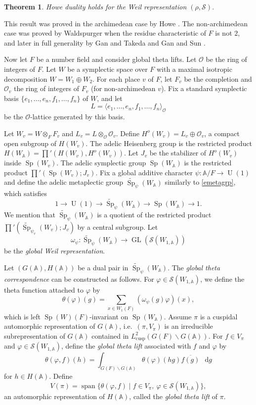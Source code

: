 \documentclass[11pt]{article}
\theoremstyle{plain}
\newtheorem{theorem}{Theorem}[section]
\theoremstyle{remark}
\theoremstyle{definition}
\newcommand*\dd{\mathop{}\!\mathrm{d}}
\DeclareMathOperator{\spn}{span}
\DeclareMathOperator{\GL}{GL}
\DeclareMathOperator{\U}{U}
\DeclareMathOperator{\cusp}{cusp}
\DeclareMathOperator{\Sp}{Sp}
\begin{document}
\begin{theorem}
Howe duality holds for the Weil representation $(\rho,\mathcal{S})$.
\end{theorem}
This result was proved in the archimedean case by Howe \cite{Howe77}.
The non-archimedean case was proved by Waldspurger \cite{Waldspurger1989} when the residue characteristic of $F$ is not $2$, and later in full generality by Gan and Takeda \cite{GanTak2016} and Gan and Sun \cite{GanSun2017}.

Now let $F$ be a number field and consider global theta lifts.
Let $\mathcal{O}$ be the ring of integers of $F$.
Let $W$ be a symplectic space over $F$ with a maximal isotropic decomposition $W=W_1\oplus W_2$.
For each place $v$ of $F$, let $F_v$ be the completion and $\mathcal{O}_v$ the ring of integers of $F_v$ (for non-archimedean $v$).
Fix a standard symplectic basis $\{e_1,\dots,e_n,f_1,\dots,f_n\}$ of $W$, and let
\[
L=\langle e_1,\dots,e_n,f_1,\dots,f_n\rangle_{\mathcal{O}}
\]
be the $\mathcal{O}$-lattice generated by this basis.

Let $W_v=W\otimes_F F_v$ and $L_v=L\otimes_{\mathcal{O}}\mathcal{O}_v$.
Define $H^{o}(W_v)=L_v\oplus \mathcal{O}_v$, a compact open subgroup of $H(W_v)$.
The adelic Heisenberg group is the restricted product $H(W_{\mathbb{A}})=\prod'(H(W_v),H^{o}(W_v))$.
Let $J_v$ be the stabilizer of $H^{o}(W_v)$ inside $\Sp(W_v)$.
The adelic symplectic group $\Sp(W_{\mathbb{A}})$ is the restricted product $\prod'(\Sp(W_v);J_v)$.
Fix a global additive character $\psi\colon \mathbb{A}/F\to \U(1)$ and define the adelic metaplectic group $\widetilde{\Sp}_{\psi}(W_{\mathbb{A}})$ similarly to \eqref{emetagrp}, which satisfies
\[
1\to \U(1)\to \widetilde{\Sp}_{\psi}(W_{\mathbb{A}}) \to \Sp(W_{\mathbb{A}})\to 1.
\]
We mention that $\widetilde{\Sp}_{\psi}(W_{\mathbb{A}})$ is a quotient of the restricted product $\prod'(\widetilde{\Sp}_{\psi_v}(W_v); J_v)$ by a central subgroup.
Let
\[
\omega_{\psi}\colon \widetilde{\Sp}_{\psi}(W_{\mathbb{A}}) \to \GL(\mathcal{S}(W_{1,\mathbb{A}}))
\]
be the \emph{global Weil representation}.

Let $(G(\mathbb{A}),H(\mathbb{A}))$ be a dual pair in $\widetilde{\Sp}_{\psi}(W_{\mathbb{A}})$.
The \emph{global theta correspondence} can be constructed as follows.
For $\varphi\in \mathcal{S}(W_{1,\mathbb{A}})$, we define the theta function attached to $\varphi$ by
\[
\theta(\varphi)(g)=\sum_{x\in W_{1}(F)}(\omega_{\psi}(g)\varphi)(x),
\]
which is left $\Sp(W)(F)$-invariant on $\Sp(W_{\mathbb{A}})$.
Assume $\pi$ is a cuspidal automorphic representation of $G(\mathbb{A})$, i.e.\ $(\pi,V_{\pi})$ is an irreducible subrepresentation of $G(\mathbb{A})$ contained in $L^2_{\cusp}(G(F)\backslash G(\mathbb{A}))$.
For $f\in V_{\pi}$ and $\varphi\in \mathcal{S}(W_{1,\mathbb{A}})$, define the \emph{global theta lift} associated with $f$ and $\varphi$ by
\[
\theta(\varphi,f)(h)=\int_{G(F)\backslash G(\mathbb{A})}\theta(\varphi)(hg)\overline{f(g)}\,\dd g
\]
for $h\in H(\mathbb{A})$.
Define
\[
V(\pi)=\spn\{\theta(\varphi,f)\mid f\in V_{\pi},\ \varphi\in  \mathcal{S}(W_{1,\mathbb{A}})\},
\]
an automorphic representation of $H(\mathbb{A})$, called the \emph{global theta lift} of $\pi$.
\end{document}
